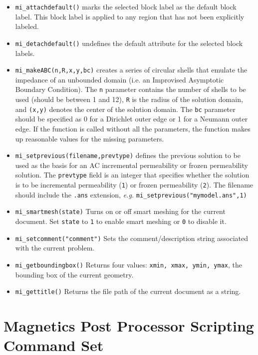 \begin{itemize}
\item{\tt mi\_attachdefault()} marks the
selected block label as the default block label.  This block label
is applied to any region that has not been explicitly labeled.

\item{\tt mi\_detachdefault()} undefines the default
attribute for the selected block labels.

\item{\tt mi\_makeABC(n,R,x,y,bc)} creates a series of circular shells that emulate the
impedance of an unbounded domain (i.e. an Improvised Asymptotic Boundary
Condition).  The {\tt n} parameter contains the number of shells to be used
(should be between 1 and 12), {\tt R} is the radius of the solution domain, and
{\tt (x,y)} denotes the center of the solution domain.  The {\tt bc} parameter should
be specified as 0 for a Dirichlet outer edge or 1 for a Neumann outer edge.
If the function is called without all the parameters, the function makes up
reasonable values for the missing parameters. 

\item{\tt mi\_setprevious(filename,prevtype)} defines the previous solution to be used as the basis for an AC incremental
permeability or frozen permeability solution.  The {\tt prevtype} field is an integer that specifies whether the solution
is to be incremental permeability ({\tt 1}) or frozen permeability ({\tt 2}). The filename should include the {\tt .ans}
extension, {\em e.g.} {\tt mi\_setprevious("mymodel.ans",1)}

\item{\tt mi\_smartmesh(state)} Turns on or off smart meshing for the current document.  Set {\tt state} to {\tt 1} to enable smart meshing or {\tt 0} to disable it.

\item{\tt mi\_setcomment("comment")} Sets the comment/description string associated with the current problem.

\item{\tt mi\_getboundingbox()} Returns four values: {\tt xmin, xmax, ymin, ymax}, the bounding box of the current geometry.

\item{\tt mi\_gettitle()} Returns the file path of the current document as a string.

\end{itemize}

\section{Magnetics Post Processor Scripting Command Set}

